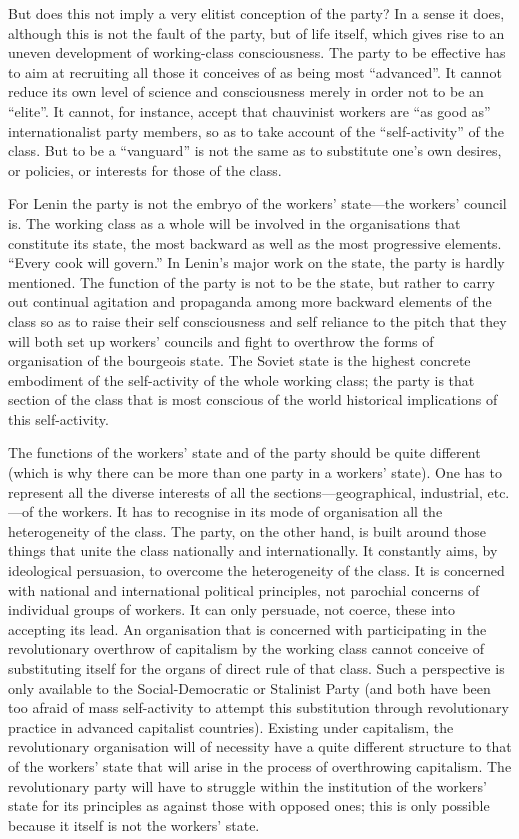 But does this not imply a very elitist conception of the party? In a sense it does, although this is not the fault of the party, but of life itself, which gives rise to an uneven development of working-class consciousness. The party to be effective has to aim at recruiting all those it conceives of as being most ``advanced''. It cannot reduce its own level of science and consciousness merely in order not to be an ``elite''. It cannot, for instance, accept that chauvinist workers are ``as good as'' internationalist party members, so as to take account of the ``self-activity'' of the class. But to be a ``vanguard'' is not the same as to substitute one's own desires, or policies, or interests for those of the class.

For Lenin the party is not the embryo of the workers' state---the workers' council is. The working class as a whole will be involved in the organisations that constitute its state, the most backward as well as the most progressive elements. ``Every cook will govern.'' In Lenin's major work on the state, the party is hardly mentioned. The function of the party is not to be the state, but rather to carry out continual agitation and propaganda among more backward elements of the class so as to raise their self consciousness and self reliance to the pitch that they will both set up workers' councils and fight to overthrow the forms of organisation of the bourgeois state. The Soviet state is the highest concrete embodiment of the self-activity of the whole working class; the party is that section of the class that is most conscious of the world historical implications of this self-activity.

The functions of the workers' state and of the party should be quite different (which is why there can be more than one party in a workers' state). One has to represent all the diverse interests of all the sections---geographical, industrial, etc.---of the workers. It has to recognise in its mode of organisation all the heterogeneity of the class. The party, on the other hand, is built around those things that unite the class nationally and internationally. It constantly aims, by ideological persuasion, to overcome the heterogeneity of the class. It is concerned with national and international political principles, not parochial concerns of individual groups of workers. It can only persuade, not coerce, these into accepting its lead. An organisation that is concerned with participating in the revolutionary overthrow of capitalism by the working class cannot conceive of substituting itself for the organs of direct rule of that class. Such a perspective is only available to the Social-Democratic or Stalinist Party (and both have been too afraid of mass self-activity to attempt this substitution through revolutionary practice in advanced capitalist countries). Existing under capitalism, the revolutionary organisation will of necessity have a quite different structure to that of the workers' state that will arise in the process of overthrowing capitalism. The revolutionary party will have to struggle within the institution of the workers' state for its principles as against those with opposed ones; this is only possible because it itself is not the workers' state.

